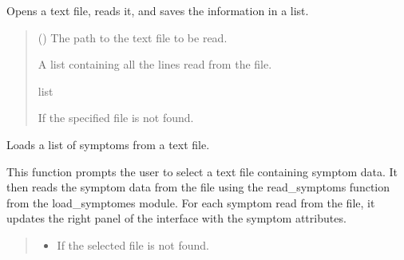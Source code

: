 \documentclass[letterpaper,10pt,english]{sphinxmanual}
\begin{document}
\begin{fulllineitems}
\begin{fulllineitems}
\begin{quote}
\begin{description}
\end{description}\end{quote}

\end{fulllineitems}


\begin{fulllineitems}
\label{\detokenize{general_interface:general_interface_V10.InterfaceGenerale.lire_fichier}}
\pysigstartsignatures
{}
\pysigstopsignatures
\sphinxAtStartPar
Opens a text file, reads it, and saves the information in a list.
\begin{quote}\begin{description}
\sphinxAtStartPar
{} () \textendash{} The path to the text file to be read.

\sphinxAtStartPar
A list containing all the lines read from the file.

\sphinxAtStartPar
list

\sphinxAtStartPar
{} \textendash{} If the specified file is not found.

\end{description}\end{quote}

\end{fulllineitems}


\begin{fulllineitems}
\label{\detokenize{general_interface:general_interface_V10.InterfaceGenerale.load_symptoms}}
\pysigstartsignatures
{}
\pysigstopsignatures
\sphinxAtStartPar
Loads a list of symptoms from a text file.

\sphinxAtStartPar
This function prompts the user to select a text file containing symptom data. It then reads the symptom data from the file
using the read\_symptoms function from the load\_symptomes module. For each symptom read from the file, it updates the right panel of
the interface with the symptom attributes.
\begin{quote}\begin{description}
\begin{itemize}
\item {} 
\sphinxAtStartPar
{} \textendash{} If the selected file is not found.


\end{itemize}
\end{description}
\end{quote}
\end{fulllineitems}
\end{fulllineitems}
\end{document}
